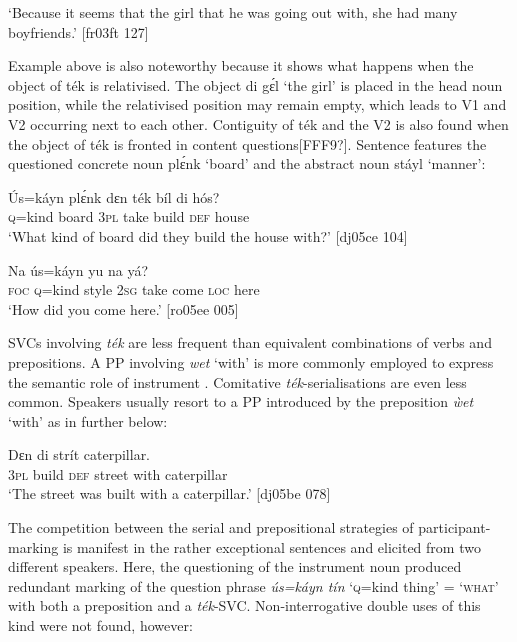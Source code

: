\glt ‘Because it seems that the girl that he was going out with, she had many boyfriends.’
[fr03ft 127]
\z

Example  above is also noteworthy because it shows what happens when the object of ték is relativised. The object di gɛ́l ‘the girl’ is placed in the head noun position, while the relativised position may remain empty, which leads to V1 and V2 occurring next to each other. Contiguity of ték and the V2 is also found when the object of ték is fronted in content questions[FFF9?]. Sentence  features the questioned concrete noun plɛ́nk ‘board’ and  the abstract noun stáyl ‘manner’: 


\ea%
    \label{ex:key:1568}
    \gll \'{U}s=káyn  plɛ́nk  dɛn  ték    bíl    di  hós?\\
\textsc{q}=kind  board  \textsc{3pl}  take    build  \textsc{def}  house\\

\glt ‘What kind of board did they build the house with?’ [dj05ce 104]
\z


\ea%
    \label{ex:key:1569}
    \gll Na  ús=káyn    yu          na  yá?\\
\textsc{foc}  \textsc{q}=kind  style  \textsc{2sg}  take    come  \textsc{loc}  here\\

\glt ‘How did you come here.’ [ro05ee 005]
\z

SVCs involving \textit{ték} are less frequent than equivalent combinations of verbs and prepositions. A PP involving \textit{wet} ‘with’ is more commonly employed to express the semantic role of instrument\index{} . Comitative \textit{ték}{}-serialisations are even less common. Speakers usually resort to a PP introduced by the preposition\textit{ \`{w}et} ‘with’ as in  further below: 


\ea%
    \label{ex:key:1570}
    \gll Dɛn     di  strít        caterpillar.\\
\textsc{3pl}  build  \textsc{def}  street  with    caterpillar\\

\glt ‘The street was built with a caterpillar.’ [dj05be 078]
\z

The competition between the serial and prepositional strategies of participant-marking is manifest in the rather exceptional sentences  and  elicited from two different speakers. Here, the questioning of the instrument noun produced redundant marking of the question phrase \textit{ús=káyn tín} ‘\textsc{q}=kind thing’ = ‘\textsc{what’} with both a preposition and a \textit{ték}{}-SVC. Non-interrogative double uses of this kind were not found, however:


